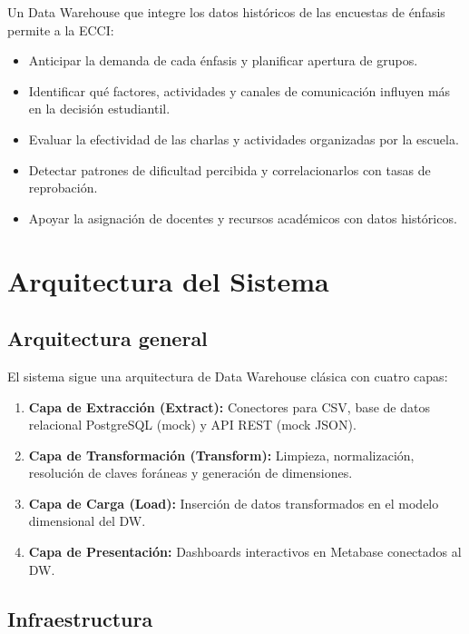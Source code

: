 \documentclass[12pt, letterpaper]{article}
\begin{document}
Un Data Warehouse que integre los datos históricos de las encuestas de énfasis permite a la ECCI:
\begin{itemize}
  \item Anticipar la demanda de cada énfasis y planificar apertura de grupos.
  \item Identificar qué factores, actividades y canales de comunicación influyen más en la decisión estudiantil.
  \item Evaluar la efectividad de las charlas y actividades organizadas por la escuela.
  \item Detectar patrones de dificultad percibida y correlacionarlos con tasas de reprobación.
  \item Apoyar la asignación de docentes y recursos académicos con datos históricos.
\end{itemize}

\section{Arquitectura del Sistema}

\subsection{Arquitectura general}

El sistema sigue una arquitectura de Data Warehouse clásica con cuatro capas:

\begin{enumerate}
  \item \textbf{Capa de Extracción (Extract):} Conectores para CSV, base de datos relacional PostgreSQL (mock) y API REST (mock JSON).
  \item \textbf{Capa de Transformación (Transform):} Limpieza, normalización, resolución de claves foráneas y generación de dimensiones.
  \item \textbf{Capa de Carga (Load):} Inserción de datos transformados en el modelo dimensional del DW.
  \item \textbf{Capa de Presentación:} Dashboards interactivos en Metabase conectados al DW.
\end{enumerate}

\subsection{Infraestructura}
\end{document}
